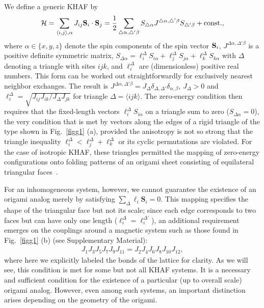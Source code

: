 \documentclass[a4paper,aps,prl,twocolumn,floatfix,showpacs,superscriptaddress]{revtex4-1}
\def\coup{J} %
\begin{document}
We define a generic KHAF by
\begin{equation}
 \mathcal{H} =  \sum_{\langle i,j \rangle,\alpha} \coup_{ij}{\bf S}_i\cdot {\bf S}_j = \frac{1}{2} \sum_{\triangle\alpha,\triangle'\beta} S_{\triangle\alpha} J^{\triangle\alpha,\triangle'\beta} S_{\triangle'\beta} + {\rm{const.}},
 \label{eq:ham1}
\end{equation}
where $\alpha\in\{x,y,z\}$ denote the spin components of the spin vector ${\bf S}_i$, $J^{\Delta\alpha,\Delta'\beta}$ is a positive definite symmetric matrix, $S_{\Delta\alpha} = \ell^\Delta_iS_{i\alpha} + \ell^\Delta_jS_{j\alpha}+\ell^\Delta_kS_{k\alpha}$ with $\Delta$ denoting a triangle with sites $ijk$, and $\ell^\Delta_i$ are (dimensionless) positive real numbers. This form can be worked out straightforwardly for exclusively nearest neighbor exchanges. The result is $J^{\Delta\alpha,\Delta'\beta} = J_\Delta \delta_{\Delta,\Delta'}\delta_{\alpha,\beta}$, $J_\Delta > 0$ and $\ell^\Delta_i = \sqrt{J_{ij}J_{ik}/J_\Delta J_{jk}}$ for triangle $\Delta =\langle ijk\rangle$. The zero-energy condition then requires that the fixed-length vectors $\ell^\Delta_i S_{i\alpha}$ on a triangle sum to zero ($S_{\Delta\alpha}=0$), the very condition that is met by vectors along the edges of a rigid triangle of the type shown in Fig.~\ref{figg1} (a), provided the anisotropy is not so strong that the triangle inequality $\ell^\Delta_i < \ell^\Delta_j + \ell^\Delta_k$ or its cyclic permutations are violated. For the case of isotropic KHAF, these triangles permitted the mapping of zero-energy configurations onto folding patterns of an origami sheet consisting of equilateral triangular faces~\cite{shender1993kagome,chandra1993anisotropic, Ritchey1993spin}.

For an inhomogeneous system, however, we cannot guarantee the existence of an origami analog merely by satisfying $\sum_\Delta \ell_i \mathbf{S}_i=0$. This mapping specifies the shape of the triangular face but not its scale; since each edge corresponds to two faces but can have only one length ($\ell^\Delta_i = \ell^{\Delta'}_i$), an additional requirement emerges on the couplings around a magnetic system such as those found in Fig.~\ref{figg1} (b) (see Supplementary Material):
\begin{align}
 J_1J_3J_5J_7J_9J_{11}=J_2J_4J_6J_8J_{10}J_{12},
 \label{eq:star}
\end{align}
where here we explicitly labeled the bonds of the lattice for clarity. As we will see, this condition is met for some but not all KHAF systems. It is a necessary and sufficient condition for the existence of a particular (up to overall scale) origami analog. However, even among such systems, an important distinction arises depending on the geometry of the origami.
\end{document}

